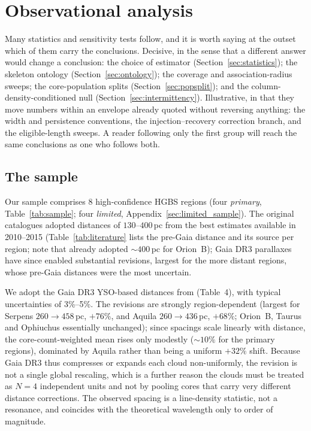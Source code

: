 \documentclass[usenatbib,twoside,twocolumn]{mnras}
\begin{document}
\section{Observational analysis}

\noindent Many statistics and sensitivity tests follow, and it is worth saying at the outset which of them carry the conclusions. Decisive, in the sense that a different answer would change a conclusion: the choice of estimator (Section~\ref{sec:statistics}); the skeleton ontology (Section~\ref{sec:ontology}); the coverage and association-radius sweeps; the core-population splits (Section~\ref{sec:popsplit}); and the column-density-conditioned null (Section~\ref{sec:intermittency}). Illustrative, in that they move numbers within an envelope already quoted without reversing anything: the width and persistence conventions, the injection--recovery correction branch, and the eligible-length sweeps. A reader following only the first group will reach the same conclusions as one who follows both.

\subsection{The sample}

Our sample comprises 8 high-confidence HGBS regions (four \emph{primary}, Table~\ref{tab:sample}; four \emph{limited}, Appendix~\ref{sec:limited_sample}). The original catalogues \citep{Konyves2015, Konyves2020, Ladjelate2020, Pezzuto2021} adopted distances of $130$--$400$\,pc from the best estimates available in 2010--2015 (Table~\ref{tab:literature} lists the pre-Gaia distance and its source per region; note that \citealt{Konyves2020} already adopted $\sim400$\,pc for Orion~B); Gaia DR3 parallaxes \citep{Zhang2023} have since enabled substantial revisions, largest for the more distant regions, whose pre-Gaia distances were the most uncertain.

We adopt the Gaia DR3 YSO-based distances from \citet{Zhang2023} (Table~4), with typical uncertainties of 3\%--5\%. The revisions are strongly region-dependent (largest for Serpens $260\to458$\,pc, $+76\%$, and Aquila $260\to436$\,pc, $+68\%$; Orion~B, Taurus and Ophiuchus essentially unchanged); since spacings scale linearly with distance, the core-count-weighted mean rises only modestly ($\sim10\%$ for the primary regions), dominated by Aquila rather than being a uniform $+32\%$ shift. Because Gaia DR3 thus compresses or expands each cloud non-uniformly, the revision is not a single global rescaling, which is a further reason the clouds must be treated as $N=4$ independent units  and not by pooling cores that carry very different distance corrections. The observed spacing is a line-density statistic, not a resonance, and coincides with the theoretical wavelength only to order of magnitude.
\end{document}
